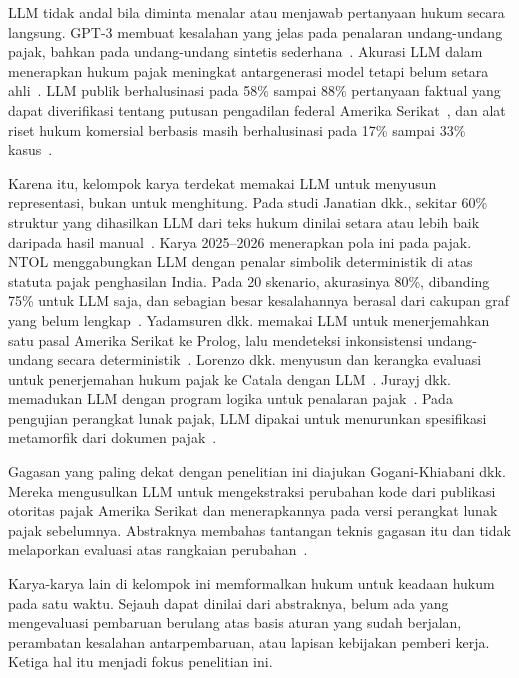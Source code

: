 LLM tidak andal bila diminta menalar atau menjawab pertanyaan hukum secara langsung. GPT-3 membuat kesalahan yang jelas pada penalaran undang-undang pajak, bahkan pada undang-undang sintetis sederhana~\cite{blairstanek2023gpt3}. Akurasi LLM dalam menerapkan hukum pajak meningkat antargenerasi model tetapi belum setara ahli~\cite{nay2024taxattorneys}. LLM publik berhalusinasi pada 58\% sampai 88\% pertanyaan faktual yang dapat diverifikasi tentang putusan pengadilan federal Amerika Serikat~\cite{dahl2024legalfictions}, dan alat riset hukum komersial berbasis  masih berhalusinasi pada 17\% sampai 33\% kasus~\cite{magesh2025hallucination}.

Karena itu, kelompok karya terdekat memakai LLM untuk menyusun representasi, bukan untuk menghitung. Pada studi Janatian dkk., sekitar 60\% struktur yang dihasilkan LLM dari teks hukum dinilai setara atau lebih baik daripada hasil manual~\cite{janatian2023texttostructure}. Karya 2025--2026 menerapkan pola ini pada pajak. NTOL menggabungkan LLM dengan penalar simbolik deterministik di atas  statuta pajak penghasilan India. Pada 20 skenario, akurasinya 80\%, dibanding 75\% untuk LLM saja, dan sebagian besar kesalahannya berasal dari cakupan graf yang belum lengkap~\cite{veeramani2026neurosymbolic}. Yadamsuren dkk. memakai LLM untuk menerjemahkan satu pasal  Amerika Serikat ke Prolog, lalu mendeteksi inkonsistensi undang-undang secara deterministik~\cite{yadamsuren2026formalization}. Lorenzo dkk. menyusun  dan kerangka evaluasi untuk penerjemahan hukum pajak ke Catala dengan LLM~\cite{lorenzo2025translating}. Jurayj dkk. memadukan LLM dengan program logika untuk penalaran pajak~\cite{jurayj2026tax}. Pada pengujian perangkat lunak pajak, LLM dipakai untuk menurunkan spesifikasi metamorfik dari dokumen pajak~\cite{srinivas2023fewshot,khiabani2026agentic}.

Gagasan yang paling dekat dengan penelitian ini diajukan Gogani-Khiabani dkk. Mereka mengusulkan LLM untuk mengekstraksi perubahan kode dari publikasi otoritas pajak Amerika Serikat dan menerapkannya pada versi perangkat lunak pajak sebelumnya. Abstraknya membahas tantangan teknis gagasan itu dan tidak melaporkan evaluasi atas rangkaian perubahan~\cite{goganikhiabani2025maintaining}.

Karya-karya lain di kelompok ini memformalkan hukum untuk keadaan hukum pada satu waktu. Sejauh dapat dinilai dari abstraknya, belum ada yang mengevaluasi pembaruan berulang atas basis aturan yang sudah berjalan, perambatan kesalahan antarpembaruan, atau lapisan kebijakan pemberi kerja. Ketiga hal itu menjadi fokus penelitian ini.

